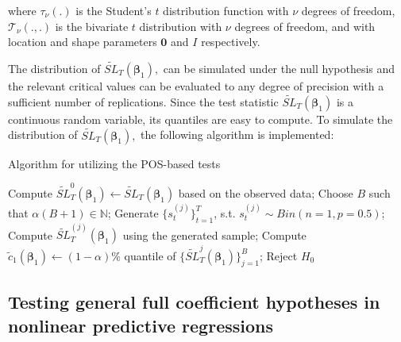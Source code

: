 \documentclass[harvard,11pt]{article}
\newcommand{\N}{\mathbb{N}}
\begin{document}
where $\tau_{\nu}(.)$ is the Student's $t$ distribution function with $\nu$ degrees of freedom, $\bm{\mathcal{T}}_{\nu}(.,.)$ is the bivariate $t$ distribution with $\nu$ degrees of freedom, and with location and shape parameters $\bm{0}$ and $I$ respectively.

The distribution of $\widetilde{SL}_{T}(\bm{\beta} _{1}),$ can be simulated under the null
hypothesis and the relevant critical values can be evaluated to any degree
of precision with a sufficient number of replications. %
Since the test statistic $\widetilde{SL}_{T}(\bm{\beta}_{1})$ is a continuous random variable, its quantiles are easy to compute. To simulate the distribution of 
$\widetilde{SL}_{T}(\bm{\beta}_{1}),$ the following algorithm is implemented:
\begin{algorithm}
\caption{Algorithm for utilizing the POS-based tests }
\begin{algorithmic}[1]
\State Compute $\widetilde{SL}_{T}^{0}(\bm{\beta}_{1})\leftarrow\widetilde{SL}_{T}(\bm{\beta}_{1})$ based on the
observed data;
\State Choose $B$ such that $\alpha (B+1) \in \N$;
\State Generate $\{s_t^{(j)}\}_{t=1}^T$, s.t. $s_{t}^{(j)}\sim Bin(n = 1, p = 0.5)$;
\State Compute $\widetilde{SL}_{T}^{(j)}(\bm{\beta}_{1})$ using
the generated sample;
\EndFor
\State Compute $\tilde{c}_{1}(\bm{\beta}_{1})\leftarrow (1-\alpha )\%$ quantile of $\{\widetilde{SL}_{T}^{j}(\bm{\beta}_{1})\}_{j=1}^{B}$;
\State Reject $H_0$
\EndIf 
\end{algorithmic}
\end{algorithm}
\FloatBarrier
\subsection{Testing general full coefficient hypotheses in nonlinear predictive regressions \label{sec: Testing general full coefficient hypotheses in
nonlinear regressions}}
\end{document}
